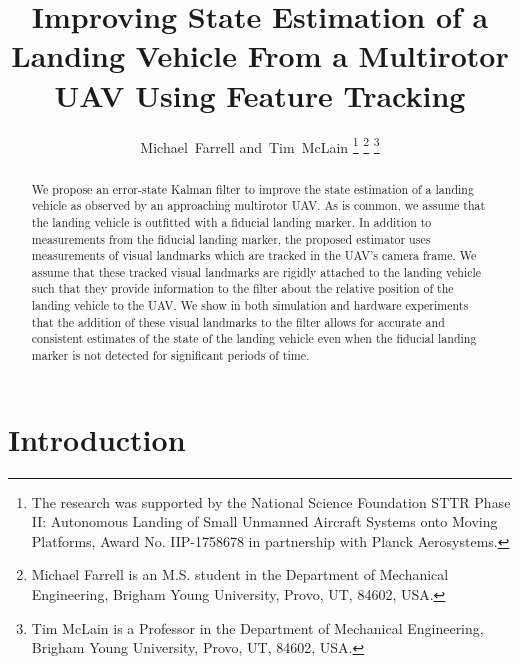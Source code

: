 \documentclass[journal,onecolumn]{IEEEtran}
\begin{document}
\title{Improving State Estimation of a Landing Vehicle From a Multirotor UAV
Using Feature Tracking}

\author{Michael~Farrell
        and~Tim~McLain
\thanks{The research was supported by the National Science Foundation STTR Phase II: Autonomous Landing of Small Unmanned Aircraft Systems onto Moving Platforms, Award No. IIP-1758678 in partnership with Planck Aerosystems.}
\thanks{Michael Farrell is an M.S. student in the Department of Mechanical
Engineering, Brigham Young University, Provo, UT, 84602, USA.}%
\thanks{Tim McLain is a Professor in the Department of Mechanical
Engineering, Brigham Young University, Provo, UT, 84602, USA.}%
}

\maketitle

\begin{abstract}
  We propose an error-state Kalman filter to improve the state estimation of a
  landing vehicle as observed by an approaching multirotor UAV. As is common, we
  assume that the landing vehicle is outfitted with a fiducial landing marker.
  In addition to measurements from the fiducial landing marker, the proposed
  estimator uses measurements of visual landmarks which are tracked in the UAV's
  camera frame. We assume that these tracked visual landmarks are rigidly
  attached to the landing vehicle such that they provide information to the
  filter about the relative position of the landing vehicle to the UAV. We show
  in both simulation and hardware experiments that the addition of these visual
  landmarks to the filter allows for accurate and consistent estimates of the
  state of the landing vehicle even when the fiducial landing marker is not
  detected for significant periods of time.
\end{abstract}

\section{Introduction} \label{sec:intro}

% 

\end{document}
